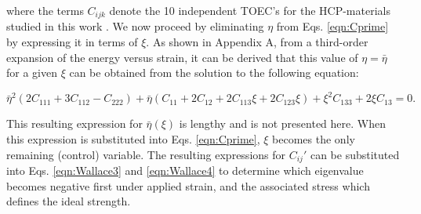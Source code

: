\documentclass[showpacs,aps,floatfix,prb,reprint,superscriptaddress]{revtex4-1}
\begin{document}
where the terms $C_{ijk}$ denote the 10 independent TOEC's for the HCP-materials studied in this work \cite{hearmon1953third,rose1968higher,fumi1951third,fumi1952third}. We now proceed by eliminating $\eta$ from Eqs. \ref{eqn:Cprime} by expressing it in terms of $\xi$.  As shown in Appendix A, from a third-order expansion of the energy versus strain, it can be derived that this value of $\eta=\bar{\eta}$ for a given $\xi$ can be obtained from the solution to the following equation:
\begin{widetext}
\begin{equation}
\label{eqn:minexpression1}
\bar{\eta}^{2} \left(2C_{111} + 3C_{112} - C_{222} \right) + \bar{\eta} \left(C_{11} + 2C_{12} + 2C_{113} \xi + 2C_{123} \xi \right) + \xi^{2} C_{133} + 2\xi C_{13} = 0.
\end{equation}
\end{widetext} 
This resulting expression for $\bar{\eta}(\xi)$ is lengthy and is not presented here.  When this expression is substituted into Eqs. \ref{eqn:Cprime}, $\xi$ becomes the only remaining (control) variable. The resulting expressions for $C_{ij}'$ can be substituted into Eqs. \ref{eqn:Wallace3} and \ref{eqn:Wallace4} to determine which eigenvalue becomes negative first under applied strain, and the associated stress which defines the ideal strength.
\end{document}
